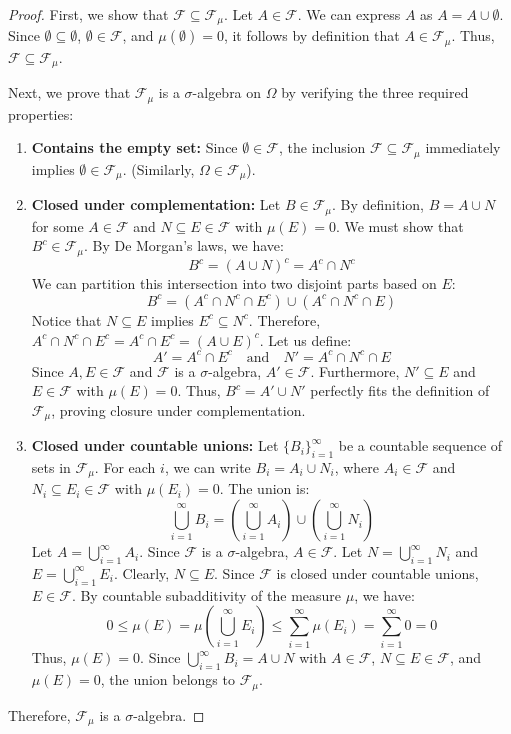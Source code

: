 \documentclass[12pt]{article}
\begin{document}
\begin{proof}
First, we show that $\mathcal{F} \subseteq \mathcal{F}_{\mu}$. Let $A \in \mathcal{F}$. We can express $A$ as $A = A \cup \emptyset$. Since $\emptyset \subseteq \emptyset$, $\emptyset \in \mathcal{F}$, and $\mu(\emptyset) = 0$, it follows by definition that $A \in \mathcal{F}_{\mu}$. Thus, $\mathcal{F} \subseteq \mathcal{F}_{\mu}$.

Next, we prove that $\mathcal{F}_{\mu}$ is a $\sigma$-algebra on $\Omega$ by verifying the three required properties:
\begin{enumerate}
    \item \textbf{Contains the empty set:} Since $\emptyset \in \mathcal{F}$, the inclusion $\mathcal{F} \subseteq \mathcal{F}_{\mu}$ immediately implies $\emptyset \in \mathcal{F}_{\mu}$. (Similarly, $\Omega \in \mathcal{F}_{\mu}$).
    
    \item \textbf{Closed under complementation:} Let $B \in \mathcal{F}_{\mu}$. By definition, $B = A \cup N$ for some $A \in \mathcal{F}$ and $N \subseteq E \in \mathcal{F}$ with $\mu(E) = 0$. We must show that $B^c \in \mathcal{F}_{\mu}$. By De Morgan's laws, we have:
    $$ B^c = (A \cup N)^c = A^c \cap N^c $$
    We can partition this intersection into two disjoint parts based on $E$:
    $$ B^c = (A^c \cap N^c \cap E^c) \cup (A^c \cap N^c \cap E) $$
    Notice that $N \subseteq E$ implies $E^c \subseteq N^c$. Therefore, $A^c \cap N^c \cap E^c = A^c \cap E^c = (A \cup E)^c$. Let us define:
    $$ A' = A^c \cap E^c \quad \text{and} \quad N' = A^c \cap N^c \cap E $$
    Since $A, E \in \mathcal{F}$ and $\mathcal{F}$ is a $\sigma$-algebra, $A' \in \mathcal{F}$. Furthermore, $N' \subseteq E$ and $E \in \mathcal{F}$ with $\mu(E) = 0$. Thus, $B^c = A' \cup N'$ perfectly fits the definition of $\mathcal{F}_{\mu}$, proving closure under complementation.
    
    \item \textbf{Closed under countable unions:} Let $\{B_i\}_{i=1}^{\infty}$ be a countable sequence of sets in $\mathcal{F}_{\mu}$. For each $i$, we can write $B_i = A_i \cup N_i$, where $A_i \in \mathcal{F}$ and $N_i \subseteq E_i \in \mathcal{F}$ with $\mu(E_i) = 0$. The union is:
    $$ \bigcup_{i=1}^{\infty} B_i = \left( \bigcup_{i=1}^{\infty} A_i \right) \cup \left( \bigcup_{i=1}^{\infty} N_i \right) $$
    Let $A = \bigcup_{i=1}^{\infty} A_i$. Since $\mathcal{F}$ is a $\sigma$-algebra, $A \in \mathcal{F}$. Let $N = \bigcup_{i=1}^{\infty} N_i$ and $E = \bigcup_{i=1}^{\infty} E_i$. Clearly, $N \subseteq E$. Since $\mathcal{F}$ is closed under countable unions, $E \in \mathcal{F}$. By countable subadditivity of the measure $\mu$, we have:
    $$ 0 \le \mu(E) = \mu\left(\bigcup_{i=1}^{\infty} E_i\right) \le \sum_{i=1}^{\infty} \mu(E_i) = \sum_{i=1}^{\infty} 0 = 0 $$
    Thus, $\mu(E) = 0$. Since $\bigcup_{i=1}^{\infty} B_i = A \cup N$ with $A \in \mathcal{F}$, $N \subseteq E \in \mathcal{F}$, and $\mu(E) = 0$, the union belongs to $\mathcal{F}_{\mu}$.
\end{enumerate}
Therefore, $\mathcal{F}_{\mu}$ is a $\sigma$-algebra.
\end{proof}
\end{document}
